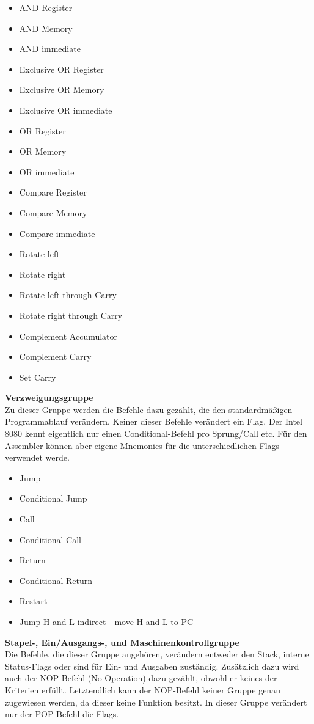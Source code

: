 \documentclass[12pt]{article}
\begin{document}
\begin{multicols}{2}
\begin{itemize}
\item AND Register
\item AND Memory
\item AND immediate
\item Exclusive OR Register
\item Exclusive OR Memory
\item Exclusive OR immediate
\item OR Register
\item OR Memory
\item OR immediate
\item Compare Register
\item Compare Memory
\item Compare immediate
\item Rotate left
\item Rotate right
\item Rotate left through Carry
\item Rotate right through Carry
\item Complement Accumulator
\item Complement Carry
\item Set Carry
\end{itemize}
\end{multicols}

\vspace{10pt}
\noindent
\textbf{Verzweigungsgruppe}\\
Zu dieser Gruppe werden die Befehle dazu gezählt, die den standardmäßigen Programmablauf verändern. Keiner dieser Befehle verändert ein Flag. Der Intel 8080 kennt eigentlich nur einen Conditional-Befehl pro Sprung/Call etc. Für den Assembler können aber eigene Mnemonics für die unterschiedlichen Flags verwendet werde.

\begin{itemize}
\item Jump
\item Conditional Jump
\item Call
\item Conditional Call
\item Return
\item Conditional Return
\item Restart
\item Jump H and L indirect - move H and L to PC
\end{itemize}

\vspace{10pt}
\noindent
\textbf{Stapel-, Ein/Ausgangs-, und Maschinenkontrollgruppe}\\
Die Befehle, die dieser Gruppe angehören, verändern entweder den Stack, interne Status-Flags oder sind für Ein- und Ausgaben zuständig. Zusätzlich dazu wird auch der NOP-Befehl (No Operation) dazu gezählt, obwohl er keines der Kriterien erfüllt. Letztendlich kann der NOP-Befehl keiner Gruppe genau zugewiesen werden, da dieser keine Funktion besitzt.
In dieser Gruppe verändert nur der POP-Befehl die Flags.
\end{document}
